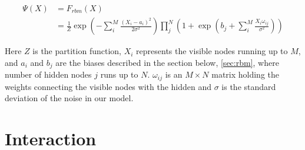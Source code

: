 \begin{align}\label{eq:F_rbm}
\Psi(X) &= F_{rbm}(X) \\
&= \frac{1}{Z} \exp \left( -\sum_{i}^{M} \frac{(X_i - a_i)^2}{2 \sigma^2} \right) \prod_{j}^{N} \left( 1 + \exp \left( b_j + \sum_{i}^{M} \frac{X_i \omega_{ij}}{\sigma^2} \right) \right)
\end{align}

Here $Z$ is the partition function, $X_i$ represents the visible nodes running up to $M$, and $a_i$ and $b_j$ are the biases described in the section below, \eqref{sec:rbm}, where number of hidden nodes $j$ runs up to $N$. 
$\omega_{ij}$ is an $M \times N$ matrix holding the weights connecting the visible nodes with the hidden and $\sigma$ is the standard deviation of the noise in our model. \\

\section{Interaction}